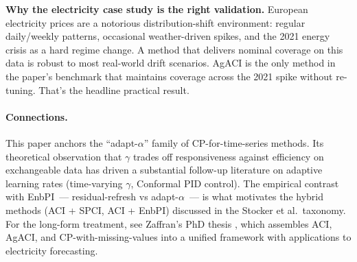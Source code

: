 \documentclass[letterpaper,11pt,leqno]{article}
\newcommand{\bib}{paper.bib}
\begin{document}
\begin{whymatters}
\textbf{Why the electricity case study is the right validation.} European electricity prices are a notorious distribution-shift environment: regular daily/weekly patterns, occasional weather-driven spikes, and the 2021 energy crisis as a hard regime change. A method that delivers nominal coverage on this data is robust to most real-world drift scenarios. AgACI is the only method in the paper's benchmark that maintains coverage across the 2021 spike without re-tuning. That's the headline practical result.
\end{whymatters}

\paragraph{Connections.} This paper anchors the ``adapt-$\alpha$'' family of CP-for-time-series methods. Its theoretical observation that $\gamma$ trades off responsiveness against efficiency on exchangeable data has driven a substantial follow-up literature on adaptive learning rates (time-varying $\gamma$, Conformal PID control). The empirical contrast with EnbPI~--- residual-refresh vs adapt-$\alpha$~--- is what motivates the hybrid methods (ACI + SPCI, ACI + EnbPI) discussed in the Stocker et al.\ taxonomy. For the long-form treatment, see Zaffran's PhD thesis \cite{zaffran2024phd}, which assembles ACI, AgACI, and CP-with-missing-values into a unified framework with applications to electricity forecasting.


\end{document}
